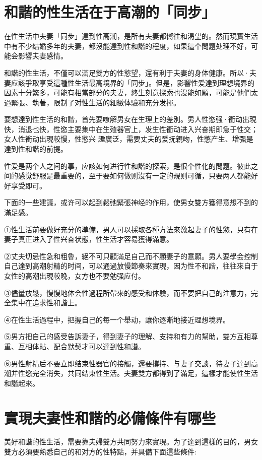 \documentclass[12pt,UTF8]{ctexbook}
\begin{document}
\section{和諧的性生活在于高潮的「同步」}

在性生活中夫妻「同步」達到性高潮，是所有夫妻都嚮往和渴望的。然而現實生活中有不少结婚多年的夫妻，都沒能達到性和諧的程度，如果這个問題处理不好，可能会影響夫妻感情。

和諧的性生活，不僅可以滿足雙方的性慾望，還有利于夫妻的身体健康。所以·夫妻应該爭取享受這種性生活最高境界的「同步」。但是，影響性爱達到理想境界的因素十分繁多，可能有相當部分的夫妻，終生刻意探索也沒能如願，可能是他們太過緊張、執著，限制了对性生活的細緻体驗和充分发揮。

要想達到性生活的和諧，首先要嘹解男女在生理上的差別。男人性慾强·衝动出現快，消退也快，性慾主要集中在生殖器官上，发生性衝动进入兴奋期即急于性交；女人性衝动出現較慢，性慾兴
趣廣泛，需要丈夫的爱抚親吻，性憋产生、增强是達到性和諧的前提。

性爱是两个人之间的事，应該如何进行性和諧的探索，是很个性化的問題。彼此之间的感觉舒服是最重要的，至于要如何做则沒有一定的規则可循，只要两人都能好好享受即可。

下面的一些建議，或许可以起到鬆弛緊張神经的作用，使男女雙方獲得意想不到的滿足感。

①性生活前要做好充分的準備，男人可以採取各種方法來激起妻子的性慾，只有在妻子真正进入了性兴奋状態，性生活才容易獲得滿意。

②丈夫切忌性急和粗魯，絕不可只顧滿足自己而不顧妻子的意願。男人要學会控制自己達到高潮射精的时间，可以通過放慢節奏來實現，因为性不和諧，往往來自于女性的高潮出現較晚，女方也不要勉强应付。

③儘量放鬆，慢慢地体会性過程所帶來的感受和体驗，而不要把自己的注意力，完全集中在追求性和諧上。

④在性生活過程中，把握自己的每一个舉动，讓你逐漸地接近理想境界。

⑤男方把自己的感受告訴妻子，得到妻子的理解、支持和有力的幫助，雙方互相尊重、互相体貼、配合默契才可以達到性和諧。

⑥男性射精后不要立即结束性器官的接觸，還要撐持、与妻子交談，待妻子達到高潮并性慾完全消失，共同结束性生活。夫妻雙方都得到了滿足，這樣才能使性生活和諧起來。

\section{實現夫妻性和諧的必備條件有哪些}

美好和諧的性生活，需要靠夫婦雙方共同努力來實現。为了達到這樣的目的，男女雙方必須要熟悉自己的和对方的性特點，并具備下面這些條件:
\end{document}
